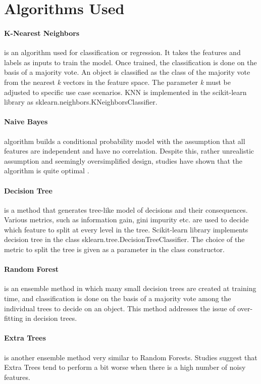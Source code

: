 \section{Algorithms Used}

\paragraph{K-Nearest Neighbors} is an algorithm used for classification or regression. It takes the features and labels as inputs to train the model. Once trained, the classification is done on the basis of a majority vote. An object is classified as the class of the majority vote from the nearest \textit{k} vectors in the feature space. The parameter \textit{k} must be adjusted to specific use case scenarios. KNN is implemented in the scikit-learn library \cite{scikit-learn} as sklearn.neighbors.KNeighborsClassifier.

\paragraph{Naive Bayes} algorithm builds a conditional probability model with the assumption that all features are independent and have no correlation. Despite this, rather unrealistic assumption and seemingly oversimplified design, studies have shown that the algorithm is quite optimal \cite{nb_optimal}.

\paragraph{Decision Tree} is a method that generates tree-like model of decisions and their consequences. Various metrics, such as information gain, gini impurity etc. are used to decide which feature to split at every level in the tree. Scikit-learn library \cite{scikit-learn} implements decision tree in the class sklearn.tree.DecisionTreeClassifier. The choice of the metric to split the tree is given as a parameter in the class constructor.

\paragraph{Random Forest} \cite{random_forest} is an ensemble method in which many small decision trees are created at training time, and classification is done on the basis of a majority vote among the individual trees to decide on an object. This method addresses the issue of over-fitting in decision trees.

\paragraph{Extra Trees} is another ensemble method very similar to Random Forests. Studies suggest \cite{extra_tree} that Extra Trees tend to perform a bit worse when there is a high number of noisy features.
